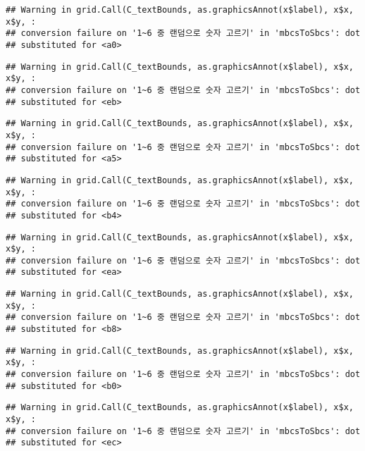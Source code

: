 \documentclass[]{book}
\begin{document}
\begin{verbatim}
## Warning in grid.Call(C_textBounds, as.graphicsAnnot(x$label), x$x, x$y, :
## conversion failure on '1~6 중 랜덤으로 숫자 고르기' in 'mbcsToSbcs': dot
## substituted for <a0>
\end{verbatim}

\begin{verbatim}
## Warning in grid.Call(C_textBounds, as.graphicsAnnot(x$label), x$x, x$y, :
## conversion failure on '1~6 중 랜덤으로 숫자 고르기' in 'mbcsToSbcs': dot
## substituted for <eb>
\end{verbatim}

\begin{verbatim}
## Warning in grid.Call(C_textBounds, as.graphicsAnnot(x$label), x$x, x$y, :
## conversion failure on '1~6 중 랜덤으로 숫자 고르기' in 'mbcsToSbcs': dot
## substituted for <a5>
\end{verbatim}

\begin{verbatim}
## Warning in grid.Call(C_textBounds, as.graphicsAnnot(x$label), x$x, x$y, :
## conversion failure on '1~6 중 랜덤으로 숫자 고르기' in 'mbcsToSbcs': dot
## substituted for <b4>
\end{verbatim}

\begin{verbatim}
## Warning in grid.Call(C_textBounds, as.graphicsAnnot(x$label), x$x, x$y, :
## conversion failure on '1~6 중 랜덤으로 숫자 고르기' in 'mbcsToSbcs': dot
## substituted for <ea>
\end{verbatim}

\begin{verbatim}
## Warning in grid.Call(C_textBounds, as.graphicsAnnot(x$label), x$x, x$y, :
## conversion failure on '1~6 중 랜덤으로 숫자 고르기' in 'mbcsToSbcs': dot
## substituted for <b8>
\end{verbatim}

\begin{verbatim}
## Warning in grid.Call(C_textBounds, as.graphicsAnnot(x$label), x$x, x$y, :
## conversion failure on '1~6 중 랜덤으로 숫자 고르기' in 'mbcsToSbcs': dot
## substituted for <b0>
\end{verbatim}

\begin{verbatim}
## Warning in grid.Call(C_textBounds, as.graphicsAnnot(x$label), x$x, x$y, :
## conversion failure on '1~6 중 랜덤으로 숫자 고르기' in 'mbcsToSbcs': dot
## substituted for <ec>
\end{verbatim}
\end{document}
